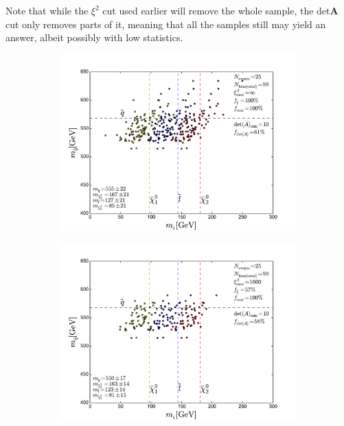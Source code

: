 \documentclass[twoside,english]{uiofysmaster}
\begin{document}
Note that while the $\xi^2$ cut used earlier will remove the whole sample, the $\mathrm{det}\mathbf A$ cut only removes parts of it, meaning that all the samples still may yield an answer, albeit possibly with low statistics.
\begin{figure}[hbt]
	\centering
	\begin{subfigure}[b]{0.45\textwidth}
		\includegraphics[width=\textwidth]{figures/improving_combinatorics/herwigpp-nosmear-4combosum-detAcut_10-xisqcut_none-nocomb-TMP.pdf} 
		\caption{ }
		\label{fig:detAcut_a}
	\end{subfigure}
	\begin{subfigure}[b]{0.45\textwidth}
		\includegraphics[width=\textwidth]{figures/improving_combinatorics/herwigpp-nosmear-4combosum-detAcut_10-xisqcut_1000-nocomb-TMP.pdf}
		\caption{ } 
		\label{fig:detAcut_b}
	\end{subfigure}


\end{figure}
\end{document}
